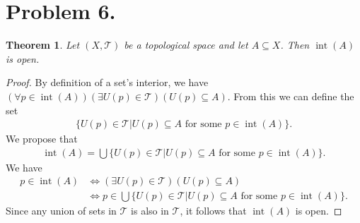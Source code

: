 \documentclass[10pt,a4paper]{article}
\theoremstyle{theorem}
\newtheorem{theorem}{Theorem}
\theoremstyle{definition}
\DeclareMathOperator{\interior}{int}
\newcommand{\Tau}{\mathcal{T}}
\begin{document}
\section*{Problem 6.}
\begin{theorem}
Let $(X,  \Tau)$ be a topological space and let $A \subseteq X$. Then $\interior(A)$ is open.
\end{theorem}

\begin{proof}
By definition of a set's interior, we have $(\forall p \in \interior(A))(\exists U(p) \in \Tau)(U(p) \subseteq A)$.  From this we can define the set 
\begin{align*}
\{U(p) \in \Tau | U(p) \subseteq A \text{ for some } p \in \interior(A)\}.
\end{align*} 
We propose that 
\begin{align*}
\interior(A) = \bigcup \{U(p) \in \Tau | U(p) \subseteq A \text{ for some } p \in \interior(A) \} \text{.}
\end{align*}
We have 
\begin{align*}
p \in \interior(A) &\iff (\exists U(p) \in \Tau)(U(p) \subseteq A)\\
&\iff p \in \bigcup \{U(p) \in \Tau | U(p) \subseteq A \text{ for some } p \in \interior(A) \} \text{.}
\end{align*}
Since any union of sets in $\Tau$ is also in $\Tau$, it follows that $\interior(A)$ is open.
\end{proof}
\end{document}
